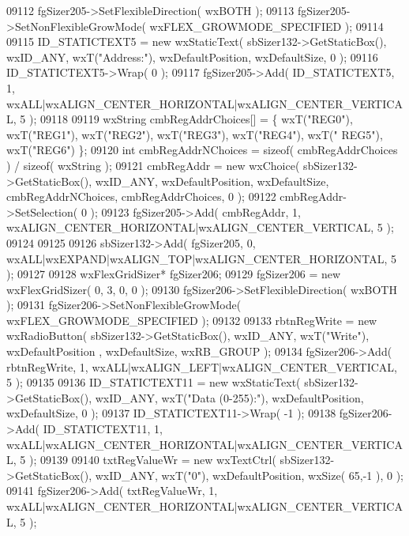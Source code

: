 \begin{DoxyCode}
09112     fgSizer205->SetFlexibleDirection( wxBOTH );
09113     fgSizer205->SetNonFlexibleGrowMode( wxFLEX\_GROWMODE\_SPECIFIED );
09114     
09115     ID_STATICTEXT5 = \textcolor{keyword}{new} wxStaticText( sbSizer132->GetStaticBox(), wxID\_ANY, wxT(\textcolor{stringliteral}{"Address:"}), 
      wxDefaultPosition, wxDefaultSize, 0 );
09116     ID_STATICTEXT5->Wrap( 0 );
09117     fgSizer205->Add( ID_STATICTEXT5, 1, wxALL|wxALIGN\_CENTER\_HORIZONTAL|wxALIGN\_CENTER\_VERTICAL, 5 );
09118     
09119     wxString cmbRegAddrChoices[] = \{ wxT(\textcolor{stringliteral}{"REG0"}), wxT(\textcolor{stringliteral}{"REG1"}), wxT(\textcolor{stringliteral}{"REG2"}), wxT(\textcolor{stringliteral}{"REG3"}), wxT(\textcolor{stringliteral}{"REG4"}), wxT(\textcolor{stringliteral}{"
      REG5"}), wxT(\textcolor{stringliteral}{"REG6"}) \};
09120     \textcolor{keywordtype}{int} cmbRegAddrNChoices = \textcolor{keyword}{sizeof}( cmbRegAddrChoices ) / \textcolor{keyword}{sizeof}( wxString );
09121     cmbRegAddr = \textcolor{keyword}{new} wxChoice( sbSizer132->GetStaticBox(), wxID\_ANY, wxDefaultPosition, wxDefaultSize, 
      cmbRegAddrNChoices, cmbRegAddrChoices, 0 );
09122     cmbRegAddr->SetSelection( 0 );
09123     fgSizer205->Add( cmbRegAddr, 1, wxALIGN\_CENTER\_HORIZONTAL|wxALIGN\_CENTER\_VERTICAL, 5 );
09124     
09125     
09126     sbSizer132->Add( fgSizer205, 0, wxALL|wxEXPAND|wxALIGN\_TOP|wxALIGN\_CENTER\_HORIZONTAL, 5 );
09127     
09128     wxFlexGridSizer* fgSizer206;
09129     fgSizer206 = \textcolor{keyword}{new} wxFlexGridSizer( 0, 3, 0, 0 );
09130     fgSizer206->SetFlexibleDirection( wxBOTH );
09131     fgSizer206->SetNonFlexibleGrowMode( wxFLEX\_GROWMODE\_SPECIFIED );
09132     
09133     rbtnRegWrite = \textcolor{keyword}{new} wxRadioButton( sbSizer132->GetStaticBox(), wxID\_ANY, wxT(\textcolor{stringliteral}{"Write"}), wxDefaultPosition
      , wxDefaultSize, wxRB\_GROUP );
09134     fgSizer206->Add( rbtnRegWrite, 1, wxALL|wxALIGN\_LEFT|wxALIGN\_CENTER\_VERTICAL, 5 );
09135     
09136     ID_STATICTEXT11 = \textcolor{keyword}{new} wxStaticText( sbSizer132->GetStaticBox(), wxID\_ANY, wxT(\textcolor{stringliteral}{"Data (0-255):"}), 
      wxDefaultPosition, wxDefaultSize, 0 );
09137     ID_STATICTEXT11->Wrap( -1 );
09138     fgSizer206->Add( ID_STATICTEXT11, 1, wxALL|wxALIGN\_CENTER\_HORIZONTAL|wxALIGN\_CENTER\_VERTICAL, 5 );
09139     
09140     txtRegValueWr = \textcolor{keyword}{new} wxTextCtrl( sbSizer132->GetStaticBox(), wxID\_ANY, wxT(\textcolor{stringliteral}{"0"}), wxDefaultPosition, 
      wxSize( 65,-1 ), 0 );
09141     fgSizer206->Add( txtRegValueWr, 1, wxALL|wxALIGN\_CENTER\_HORIZONTAL|wxALIGN\_CENTER\_VERTICAL, 5 );

\end{DoxyCode}
